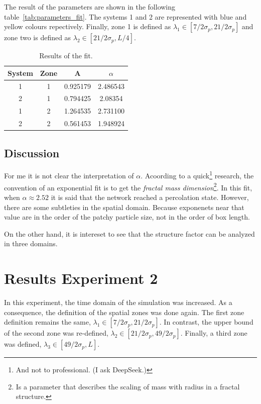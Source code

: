 \documentclass[a4paper]{tufte-handout} %
\begin{document}
The result of the parameters are shown in the following table~\ref{tab:parameters_fit}.
The systems 1 and 2 are represented with blue and yellow colours repectively.
Finally, zone 1 is defined as \(\lambda_1\in\left[ 7/2\sigma_p,21/2\sigma_p \right]\) and zone two is defined as \(\lambda_2\in\left[ 21/2\sigma_p,L/4 \right]\).

\begin{table}[ht!]
    \centering
    \begin{tabular}{|c|c|c|c|}
    \hline
    System & Zone & A        & $\alpha$ \\ \hline
    1      & 1    & 0.925179 & 2.486543 \\ \hline
    2      & 1    & 0.794425 & 2.08354  \\ \hline
    1      & 2    & 1.264535 & 2.731100 \\ \hline
    2      & 2    & 0.561453 & 1.948924 \\ \hline
    \end{tabular}
    \caption{Results of the fit.}\label{tab:parameters_fit1}
\end{table}

\subsection{Discussion}

For me it is not clear the interpretation of $\alpha$.
Acoording to a quick\footnote{And not to professional. (I ask DeepSeek.)} research, the convention of an exponential fit is to get the \textit{fractal mass dimension}\footnote{Is a parameter that describes the scaling of mass with radius in a fractal structure.}.
In this fit, when $\alpha \approx 2.52$ it is said that the network reached a percolation state.
However, there are some subtleties in the spatial domain.
Because exponenets near that value are in the order of the patchy particle size, not in the order of box length.

On the other hand, it is intereset to see that the structure factor can be analyzed in three domains.


\section{Results Experiment 2}

In this experiment, the time domain of the simulation was increased.
As a consequence, the definition of the spatial zones was done again.
The first zone definition remains the same, \(\lambda_1\in\left[ 7/2\sigma_p,21/2\sigma_p \right]\).
In contrast, the upper bound of the second zone was re-defined, \(\lambda_2\in\left[ 21/2\sigma_p, 49/2\sigma_p \right]\).
Finally, a third zone was defined, \(\lambda_3\in\left[ 49/2\sigma_p, L \right]\). 
\end{document}
